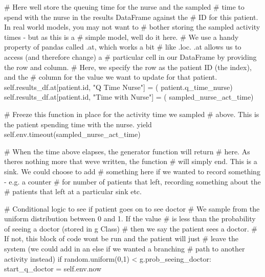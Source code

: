 \documentclass[
  letterpaper,
  DIV=11,
  numbers=noendperiod]{scrreprt}
\newenvironment{Shaded}{\begin{snugshade}}{\end{snugshade}}
\newcommand{\BuiltInTok}[1]{\textcolor[rgb]{0.00,0.23,0.31}{#1}}
\newcommand{\CommentTok}[1]{\textcolor[rgb]{0.37,0.37,0.37}{#1}}
\newcommand{\ControlFlowTok}[1]{\textcolor[rgb]{0.00,0.23,0.31}{#1}}
\newcommand{\DecValTok}[1]{\textcolor[rgb]{0.68,0.00,0.00}{#1}}
\newcommand{\NormalTok}[1]{\textcolor[rgb]{0.00,0.23,0.31}{#1}}
\newcommand{\OperatorTok}[1]{\textcolor[rgb]{0.37,0.37,0.37}{#1}}
\newcommand{\StringTok}[1]{\textcolor[rgb]{0.13,0.47,0.30}{#1}}
\newcommand{\VariableTok}[1]{\textcolor[rgb]{0.07,0.07,0.07}{#1}}
\begin{document}
\begin{tcolorbox}
\begin{Shaded}
\begin{Highlighting}[]
            \CommentTok{\# Here we\textquotesingle{}ll store the queuing time for the nurse and the sampled}
            \CommentTok{\# time to spend with the nurse in the results DataFrame against the}
            \CommentTok{\# ID for this patient.  In real world models, you may not want to}
            \CommentTok{\# bother storing the sampled activity times {-} but as this is a}
            \CommentTok{\# simple model, we\textquotesingle{}ll do it here.}
            \CommentTok{\# We use a handy property of pandas called .at, which works a bit}
            \CommentTok{\# like .loc.  .at allows us to access (and therefore change) a}
            \CommentTok{\# particular cell in our DataFrame by providing the row and column.}
            \CommentTok{\# Here, we specify the row as the patient ID (the index), and the}
            \CommentTok{\# column for the value we want to update for that patient.}
            \VariableTok{self}\NormalTok{.results\_df.at[patient.}\BuiltInTok{id}\NormalTok{, }\StringTok{"Q Time Nurse"}\NormalTok{] }\OperatorTok{=}\NormalTok{ (}
\NormalTok{                patient.q\_time\_nurse)}
            \VariableTok{self}\NormalTok{.results\_df.at[patient.}\BuiltInTok{id}\NormalTok{, }\StringTok{"Time with Nurse"}\NormalTok{] }\OperatorTok{=}\NormalTok{ (}
\NormalTok{                sampled\_nurse\_act\_time)}

            \CommentTok{\# Freeze this function in place for the activity time we sampled}
            \CommentTok{\# above.  This is the patient spending time with the nurse.}
            \ControlFlowTok{yield} \VariableTok{self}\NormalTok{.env.timeout(sampled\_nurse\_act\_time)}

            \CommentTok{\# When the time above elapses, the generator function will return}
            \CommentTok{\# here.  As there\textquotesingle{}s nothing more that we\textquotesingle{}ve written, the function}
            \CommentTok{\# will simply end.  This is a sink.  We could choose to add}
            \CommentTok{\# something here if we wanted to record something {-} e.g. a counter}
            \CommentTok{\# for number of patients that left, recording something about the}
            \CommentTok{\# patients that left at a particular sink etc.}

        \CommentTok{\# Conditional logic to see if patient goes on to see doctor}
        \CommentTok{\# We sample from the uniform distribution between 0 and 1.  If the value}
        \CommentTok{\# is less than the probability of seeing a doctor (stored in g Class)}
        \CommentTok{\# then we say the patient sees a doctor.}
        \CommentTok{\# If not, this block of code won\textquotesingle{}t be run and the patient will just}
        \CommentTok{\# leave the system (we could add in an else if we wanted a branching}
        \CommentTok{\# path to another activity instead)}
        \ControlFlowTok{if}\NormalTok{ random.uniform(}\DecValTok{0}\NormalTok{,}\DecValTok{1}\NormalTok{) }\OperatorTok{\textless{}}\NormalTok{ g.prob\_seeing\_doctor:}
\NormalTok{            start\_q\_doctor }\OperatorTok{=} \VariableTok{self}\NormalTok{.env.now}


\end{Highlighting}
\end{Shaded}
\end{tcolorbox}
\end{document}
